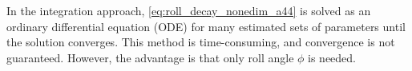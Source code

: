 In the integration approach, \autoref{eq:roll_decay_nonedim_a44} is solved as an ordinary differential equation (ODE) for many estimated sets of parameters until the solution converges. This method is time-consuming, and convergence is not guaranteed. However, the advantage is that only roll angle $\phi$ is needed.